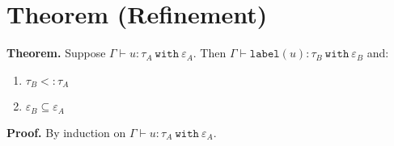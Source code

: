 \documentclass{llncs}
\newcommand{\keywadj}[1]{\mathtt{#1}}
\newcommand{\keyw}[1]{\keywadj{#1}~}
\newcommand{\kwa}[1]{\keywadj{ #1 }}
\newcommand{\type}[2]{
	#1~\keyw{with} #2
}
\begin{document}
\section{Theorem (Refinement)}

\textbf{Theorem.} Suppose $\Gamma \vdash u : \tau_A~\kwa{with}~\varepsilon_A$. Then $\Gamma \vdash \kwa{label}(u) : \type{\tau_B}{\varepsilon_B}$ and:
\begin{enumerate}
	\item $\tau_B <: \tau_A$
	\item $\varepsilon_B \subseteq \varepsilon_A$
\end{enumerate}

\noindent
\textbf{Proof.} By induction on $\Gamma \vdash u : \type{\tau_A}{\varepsilon_A}$.\\
\end{document}
